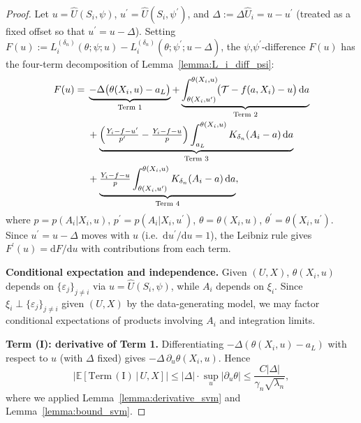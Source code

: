 \documentclass[12pt]{article}
\newcommand{\E}{\mathbb{E}}
\begin{document}
\begin{proof}
Let $u=\widehat{U}(S_i,\psi)$, $u^\prime=\widehat{U}(S_i,\psi^\prime)$, and $\Delta:=\Delta\widehat{U}_i=u-u^\prime$ (treated as a fixed offset so that $u^\prime=u-\Delta$). Setting $F(u):=L^{(\delta_n)}_i(\theta;\psi;u)-L^{(\delta_n)}_i(\theta;\psi^\prime;u-\Delta)$, the $\psi$,$\psi^\prime$-difference $F(u)$ has the four-term decomposition of Lemma~\ref{lemma:L_i_diff_psi}:
\begin{align*}
F(u)
=\;&\underbrace{-\Delta\bigl(\theta(X_i,u)-a_L\bigr)}_{\text{Term 1}}
+\underbrace{\int_{\theta(X_i,u^\prime)}^{\theta(X_i,u)}\!\bigl(\mathcal{T}-f(a,X_i)-u\bigr)\,\mathrm{d}a}_{\text{Term 2}}\\
&+\underbrace{\Bigl(\tfrac{Y_i-f-u^\prime}{p^\prime}-\tfrac{Y_i-f-u}{p}\Bigr)\int_{a_L}^{\theta(X_i,u)}K_{\delta_n}(A_i-a)\,\mathrm{d}a}_{\text{Term 3}}\\
&+\underbrace{\tfrac{Y_i-f-u}{p}\int_{\theta(X_i,u^\prime)}^{\theta(X_i,u)}K_{\delta_n}(A_i-a)\,\mathrm{d}a}_{\text{Term 4}},
\end{align*}
where $p=p(A_i|X_i,u)$, $p^\prime=p(A_i|X_i,u^\prime)$, $\theta=\theta(X_i,u)$, $\theta^\prime=\theta(X_i,u^\prime)$. Since $u^\prime=u-\Delta$ moves with $u$ (i.e.\ $\mathrm{d}u^\prime/\mathrm{d}u=1$), the Leibniz rule gives $F^\prime(u)=\mathrm{d}F/\mathrm{d}u$ with contributions from each term.

\noindent\textbf{Conditional expectation and independence.}
Given $(U,X)$, $\theta(X_i,u)$ depends on $\{\varepsilon_j\}_{j\neq i}$ via $u=\widehat{U}(S_i,\psi)$, while $A_i$ depends on $\xi_i$. Since $\xi_i\perp\{\varepsilon_j\}_{j\neq i}$ given $(U,X)$ by the data-generating model, we may factor conditional expectations of products involving $A_i$ and integration limits.

\noindent\textbf{Term (I): derivative of Term 1.}
Differentiating $-\Delta(\theta(X_i,u)-a_L)$ with respect to $u$ (with $\Delta$ fixed) gives $-\Delta\,\partial_u\theta(X_i,u)$. Hence
$$\left|\E\!\left[\mathrm{Term\,(I)}\,\big|\,U,X\right]\right|\leq|\Delta|\cdot\sup_u|\partial_u\theta|\leq\frac{C|\Delta|}{\gamma_n\sqrt{\lambda_n}},$$
where we applied Lemma~\ref{lemma:derivative_svm} and Lemma~\ref{lemma:bound_svm}.


\end{proof}
\end{document}
